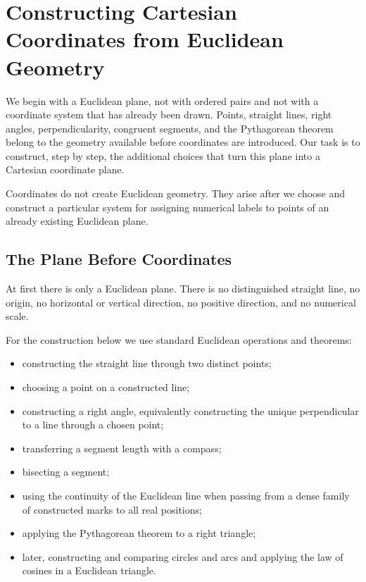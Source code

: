 \section{Constructing Cartesian Coordinates from Euclidean Geometry}

We begin with a Euclidean plane, not with ordered pairs and not with a coordinate
system that has already been drawn. Points, straight lines, right angles,
perpendicularity, congruent segments, and the Pythagorean theorem belong to the
geometry available before coordinates are introduced. Our task is to construct,
step by step, the additional choices that turn this plane into a Cartesian
coordinate plane.

\begin{remarkbox}
Coordinates do not create Euclidean geometry. They arise after we choose and
construct a particular system for assigning numerical labels to points of an
already existing Euclidean plane.
\end{remarkbox}

\subsection{The Plane Before Coordinates}

At first there is only a Euclidean plane. There is no distinguished straight
line, no origin, no horizontal or vertical direction, no positive direction,
and no numerical scale.

\begin{center}
\end{center}

\begin{definitionbox}
For the construction below we use standard Euclidean operations and theorems:
\begin{itemize}
    \item constructing the straight line through two distinct points;
    \item choosing a point on a constructed line;
    \item constructing a right angle, equivalently constructing the unique
          perpendicular to a line through a chosen point;
    \item transferring a segment length with a compass;
    \item bisecting a segment;
    \item using the continuity of the Euclidean line when passing from a dense
          family of constructed marks to all real positions;
    \item applying the Pythagorean theorem to a right triangle;
    \item later, constructing and comparing circles and arcs and applying the
          law of cosines in a Euclidean triangle.
\end{itemize}
\end{definitionbox}

